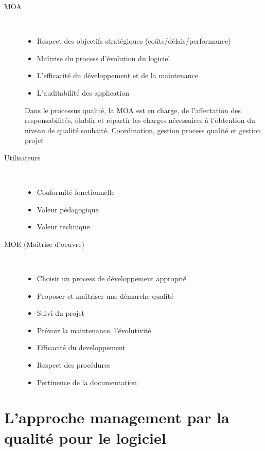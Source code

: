\begin{description}

    \item[MOA]\hfill\\
		\begin{itemize}
		\item Respect des objectifs stratégiques (coûts/délais/performance)
		\item Maîtrise du process d’évolution du logiciel
		\item L’efficacité du développement et de la maintenance
		\item L’auditabilité des application
		\end{itemize}

		Dans le processus qualité, la MOA est en charge, de l’affectation des responsabilités, établir et répartir les charges nécessaires à l’obtention du niveau de qualité souhaité.
		Coordination, gestion process qualité et gestion projet

	\item[Utilisateurs]\hfill\\
		\begin{itemize}
		\item Conformité fonctionnelle
		\item Valeur pédagogique
		\item Valeur technique
		\end{itemize}

	\item[MOE (Maîtrise d'oeuvre)]\hfill\\
		\begin{itemize}
		\item Choisir un process de développement approprié
		\item Proposer et maîtriser une démarche qualité
		\item Suivi du projet
		\item Prévoir la maintenance, l’évolutivité
		\item Efficacité du developpement
		\item Respect des procédures
		\item Pertinence de la documentation
		\end{itemize}
		
\end{description}




\section{L’approche management par la qualité pour le logiciel}

